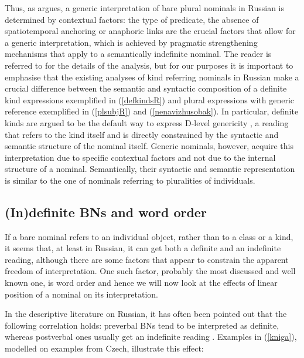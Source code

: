 \documentclass[output=paper,colorlinks,citecolor=brown]{langscibook}
\begin{document}
\noindent Thus, as \citet{seres20} argues, a generic interpretation of bare plural nominals in Russian is determined by contextual factors: the type of predicate, the absence of spatiotemporal anchoring or anaphoric links are the crucial factors that allow for a generic interpretation, which is achieved by pragmatic strengthening mechanisms that apply to a semantically indefinite nominal. The reader is referred to \citet{seres20} for the details of the analysis, but for our purposes it is important to emphasise that the existing analyses of kind referring nominals in Russian \citep{borikespinal19, borikespinal20, seres20} make a crucial difference between the semantic and syntactic composition of a definite kind expressions exemplified in (\ref{defkindsR}) and plural expressions with generic reference exemplified in (\ref{plsubjR}) and (\ref{nenavizhusobak}). In particular, definite kinds are argued to be the default way to express D-level genericity \citep[cf.][]{krifkaetal}, a reading that refers to the kind itself and is directly constrained by the syntactic and semantic structure of the nominal itself. Generic nominals, however, acquire this interpretation due to specific contextual factors and not due to the internal structure of a nominal. Semantically, their syntactic and semantic representation is similar to the one of nominals referring to pluralities of individuals. 
\fi 

\subsection{(In)definite BNs and word order}

If a bare nominal refers to an individual object, rather than to a class or a kind, it seems that, at least in Russian, it can get both a definite and an indefinite reading, although there are some factors that appear to constrain the apparent freedom of interpretation. One such factor, probably the most discussed and well known one, is word order and hence we will now look at the effects of linear position of a nominal on its interpretation. 

In the descriptive literature on Russian, it has often been pointed out that the following correlation holds: preverbal BNs tend to be interpreted as definite, whereas postverbal ones usually get an indefinite reading \citep[cf.][]{pospelov70, fursenko70, chvany73, king95}. Examples in (\ref{kniga}), modelled on  examples from Czech, illustrate this effect:
\end{document}

